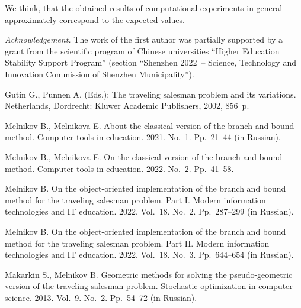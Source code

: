 \documentclass[12pt]{llncs}
\begin{document}

We think, that
the obtained results of computational experiments 
in general approximately correspond to the expected values.


\textit{Acknowledgement.}
The work of the first author 
was partially supported by a grant 
from the scientific program of Chinese universities
``Higher Education Stability Support Program''
(section ``Shenzhen 2022~-- Science, Technology 
and Innovation Commission of Shenzhen Municipality'').

%
%
\begin{thebibliography}{5}

Gutin G., Punnen A. (Eds.):
The traveling salesman problem and its variations.
Netherlands, Dordrecht: Kluwer Academic Publishers, 2002, 856~p.

Melnikov B., Melnikova E.
About the classical version of the branch and bound method.
Computer tools in education. 
2021. No.~1. Pp.~21--44 (in Russian).

Melnikov B., Melnikova E.
On the classical version of the branch and bound method.
Computer tools in education. 
2022. No.~2. Pp.~41--58.

Melnikov B.
On the object-oriented implementation
of the branch and bound method 
for the traveling salesman problem. Part I.
Modern information technologies and IT education. 
2022. Vol.~18. No.~2. Pp.~287--299 (in Russian).

Melnikov B.
On the object-oriented implementation
of the branch and bound method 
for the traveling salesman problem. Part II.
Modern information technologies and IT education. 
2022. Vol.~18. No.~3. Pp.~644--654 (in Russian).

Makarkin S., Melnikov B.
Geometric methods for solving the pseudo-geometric version 
of the traveling salesman problem.
Stochastic optimization in computer science. 
2013. Vol.~9. No.~2. Pp.~54--72 (in Russian).
\end{thebibliography}

\end{document}
